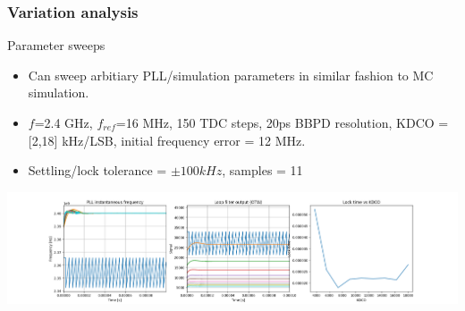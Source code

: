 \documentclass[t, screen, aspectratio=43]{beamer}
\begin{document}
\begin{frame}
	\frametitle{Variation analysis}
	\begin{block}{Parameter sweeps}
		\begin{itemize}
		\scriptsize
			\scriptsize
			\item Can sweep arbitiary PLL/simulation parameters in similar fashion to MC simulation.
			\item $f$=2.4 GHz, $f_{ref}$=16 MHz, 150 TDC steps, 20ps BBPD resolution, KDCO = [2,18] kHz/LSB, initial frequency error = 12 MHz.
			\item Settling/lock tolerance = $\pm 100 kHz$, samples = 11
		\end{itemize}    
		\center\includegraphics[width=1.0\linewidth]{sweep.png}
	\end{block}
\end{frame}





\end{document}

